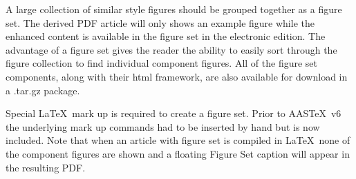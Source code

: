 \documentclass{aastex62}
\newcommand\aastex{AAS\TeX}
\newcommand\latex{La\TeX}
\begin{document}
A large collection of similar style figures should be grouped together as a
figure set.  The derived PDF article will only shows an example figure
while the enhanced content is available in the figure set in the electronic
edition.  The advantage of a figure set gives the reader the ability to
easily sort through the figure collection to find individual component
figures.  All of the figure set components, along with their html framework,
are also available for download in a .tar.gz package.

Special \latex\ mark up is required to create a figure set.  Prior to
\aastex\ v6 the underlying mark up commands had to be inserted by hand
but is now included.  Note that when an article with figure set is compiled
in \latex\ none of the component figures are shown and a floating Figure
Set caption will appear in the resulting PDF.

\figsetstart
{}

\figsetgrpstart
{}
\figsetgrpend

\figsetgrpstart
{}
\figsetgrpend

\figsetgrpstart
{}
\figsetgrpend

\figsetgrpstart
{}
\figsetgrpend

\figsetgrpstart
{}
\figsetgrpend

\figsetgrpstart
{}
\figsetgrpend

\figsetgrpstart
{}
\figsetgrpend
\end{document}
